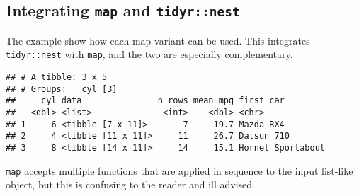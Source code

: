 \documentclass[
]{book}
\newenvironment{Shaded}{}{}
\newcommand{\CommentTok}[1]{\textcolor[rgb]{0.38,0.63,0.69}{\textit{#1}}}
\newcommand{\DataTypeTok}[1]{\textcolor[rgb]{0.56,0.13,0.00}{#1}}
\newcommand{\KeywordTok}[1]{\textcolor[rgb]{0.00,0.44,0.13}{\textbf{#1}}}
\newcommand{\NormalTok}[1]{#1}
\newcommand{\OperatorTok}[1]{\textcolor[rgb]{0.40,0.40,0.40}{#1}}
\newcommand{\StringTok}[1]{\textcolor[rgb]{0.25,0.44,0.63}{#1}}
\begin{document}
\hypertarget{integrating-map-and-tidyrnest}{%
\subsection*{\texorpdfstring{Integrating \texttt{map} and \texttt{tidyr::nest}}{Integrating map and tidyr::nest}}\label{integrating-map-and-tidyrnest}}

The example show how each map variant can be used. This integrates \texttt{tidyr::nest} with \texttt{map}, and the two are especially complementary.

\begin{Shaded}
\end{Shaded}

\begin{verbatim}
## # A tibble: 3 x 5
## # Groups:   cyl [3]
##     cyl data               n_rows mean_mpg first_car        
##   <dbl> <list>              <int>    <dbl> <chr>            
## 1     6 <tibble [7 x 11]>       7     19.7 Mazda RX4        
## 2     4 <tibble [11 x 11]>     11     26.7 Datsun 710       
## 3     8 <tibble [14 x 11]>     14     15.1 Hornet Sportabout
\end{verbatim}

\texttt{map} accepts multiple functions that are applied in sequence to the input list-like object, but this is confusing to the reader and ill advised.
\end{document}
